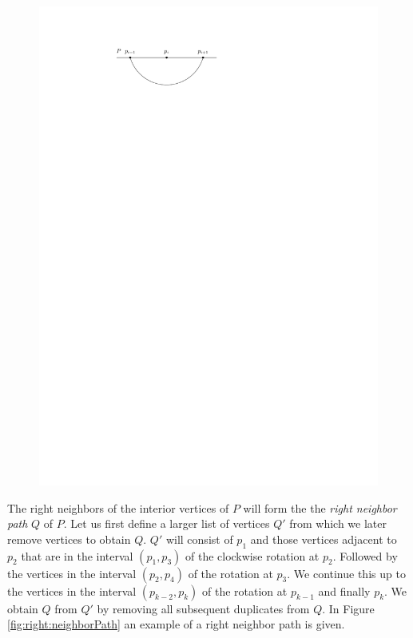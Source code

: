     \begin{figure}[h]
      \centering
      \includegraphics[scale=1]{unifiedAlgo/img/rightNeighbourwalk/pHasRightNeighbor.pdf}
      \caption{}
      \label{fig:right:pHasRightNeighbor}
    \end{figure}

    The right neighbors of the interior vertices of $P$ will form the the \emph{right neighbor path} $Q$ of $P$.
    Let us first define a larger list of vertices $Q'$ from which we later remove vertices to obtain $Q$. $Q'$ will consist of $p_1$ and those vertices adjacent to $p_{2}$ that are in the interval $(p_1, p_3)$ of the clockwise rotation at $p_2$. Followed by the vertices in the interval $(p_2, p_4)$ of the rotation at $p_{3}$. We continue this up to the vertices in the interval $(p_{k-2}, p_k)$ of the rotation at $p_{k-1}$ and finally $p_k$.
    We obtain $Q$ from $Q'$ by removing all subsequent duplicates from $Q$.
    In Figure \ref{fig:right:neighborPath} an example of a right neighbor path is given.

